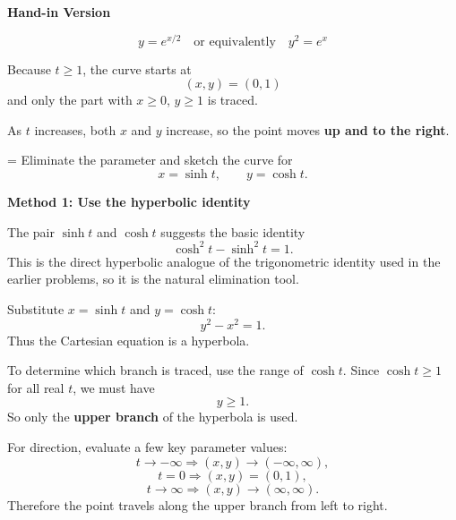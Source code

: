 \documentclass[a4paper,12pt,twocolumn]{article}
\newlength{\problemnumberwidth}
\newenvironment{solutionbox}{\begin{framed}}{\end{framed}}
\newcommand{\problem}[3]{%
  \Needspace{10\baselineskip}%
  \phantomsection\label{#1}%
  \par\vspace{0.8em}%
  \noindent
  \hangindent=\problemnumberwidth
  \hangafter=1
  \makebox[\problemnumberwidth][l]{\textbf{#2.}}#3\par
}
\begin{document}
\begin{solutionbox}
\textbf{Hand-in Version}

\[
\boxed{y=e^{x/2}\quad\text{or equivalently}\quad y^2=e^x}
\]

Because \(t\ge 1\), the curve starts at
\[
(x,y)=(0,1)
\]
and only the part with \(x\ge 0\), \(y\ge 1\) is traced.

As \(t\) increases, both \(x\) and \(y\) increase, so the point moves \textbf{up and to the right}.
\end{solutionbox}

\problem{prob:10-1-22}{22}{Eliminate the parameter and sketch the curve for
\[
x=\sinh t,\qquad y=\cosh t.
\]}

\begin{solutionbox}
\textbf{Method 1: Use the hyperbolic identity}

\begin{steps}
\item The pair \(\sinh t\) and \(\cosh t\) suggests the basic identity
\[
\cosh^2 t-\sinh^2 t=1.
\]
This is the direct hyperbolic analogue of the trigonometric identity used in the earlier problems, so it is the natural elimination tool.

\item Substitute \(x=\sinh t\) and \(y=\cosh t\):
\[
y^2-x^2=1.
\]
Thus the Cartesian equation is a hyperbola.

\item To determine which branch is traced, use the range of \(\cosh t\). Since \(\cosh t\ge 1\) for all real \(t\), we must have
\[
y\ge 1.
\]
So only the \textbf{upper branch} of the hyperbola is used.

\item For direction, evaluate a few key parameter values:
\[
t\to-\infty \Longrightarrow (x,y)\to(-\infty,\infty),
\]
\[
t=0 \Longrightarrow (x,y)=(0,1),
\]
\[
t\to\infty \Longrightarrow (x,y)\to(\infty,\infty).
\]
Therefore the point travels along the upper branch from left to right.
\end{steps}
\end{solutionbox}
\end{document}
